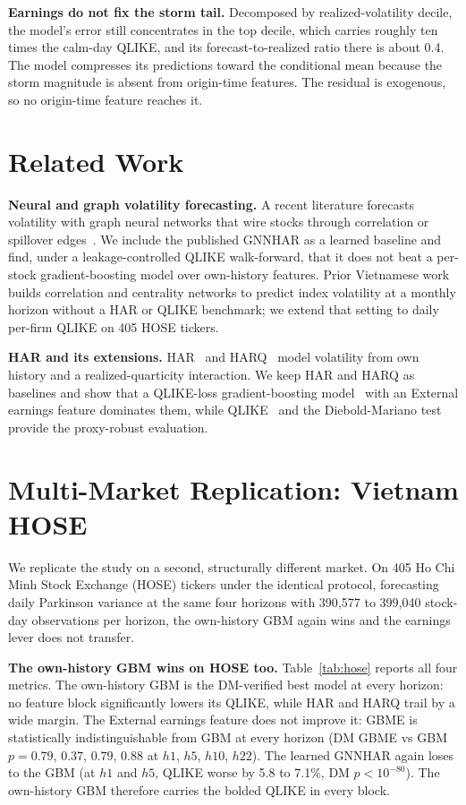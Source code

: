 \documentclass{llncs}
\begin{document}
\textbf{Earnings do not fix the storm tail.} Decomposed by realized-volatility decile, the model's
error still concentrates in the top decile, which carries roughly ten times the calm-day QLIKE, and
its forecast-to-realized ratio there is about 0.4. The model compresses its predictions toward the
conditional mean because the storm magnitude is absent from origin-time features. The residual is
exogenous, so no origin-time feature reaches it.

\FloatBarrier
\section{Related Work}
\textbf{Neural and graph volatility forecasting.} A recent literature forecasts volatility with graph
neural networks that wire stocks through correlation or spillover edges~\cite{gnnhar2024}. We include the
published GNNHAR as a learned baseline and find, under a leakage-controlled QLIKE walk-forward, that it
does not beat a per-stock gradient-boosting model over own-history features. Prior Vietnamese work builds
correlation and centrality networks to predict index volatility at a monthly horizon without a HAR or
QLIKE benchmark; we extend that setting to daily per-firm QLIKE on 405 HOSE tickers.

\textbf{HAR and its extensions.} HAR~\cite{corsi2009} and HARQ~\cite{harq2016} model volatility from
own history and a realized-quarticity interaction. We keep HAR and HARQ as baselines and show that a
QLIKE-loss gradient-boosting model~\cite{friedman2001,pedregosa2011} with an External earnings feature
dominates them, while QLIKE~\cite{patton2011} and the Diebold-Mariano
test~\cite{dm1995,hln1997} provide the proxy-robust evaluation.

\FloatBarrier
\section{Multi-Market Replication: Vietnam HOSE}\label{sec:hose}
We replicate the study on a second, structurally different market. On 405 Ho Chi Minh Stock Exchange
(HOSE) tickers under the identical protocol, forecasting daily Parkinson variance at the same four
horizons with 390{,}577 to 399{,}040 stock-day observations per horizon, the own-history GBM again wins
and the earnings lever does not transfer.

\textbf{The own-history GBM wins on HOSE too.} Table~\ref{tab:hose} reports all four
metrics. The own-history GBM is the DM-verified best model at every horizon: no feature block
significantly lowers its QLIKE, while HAR and HARQ trail by a wide margin. The External earnings feature
does not improve it: GBME is statistically indistinguishable from GBM at every horizon (DM GBME vs GBM
$p=0.79$, $0.37$, $0.79$, $0.88$ at $h1$, $h5$, $h10$, $h22$). The learned GNNHAR again loses to the GBM
(at $h1$ and $h5$, QLIKE worse by 5.8 to 7.1\%, DM $p<10^{-80}$). The own-history GBM therefore carries
the bolded QLIKE in every block.
\end{document}
